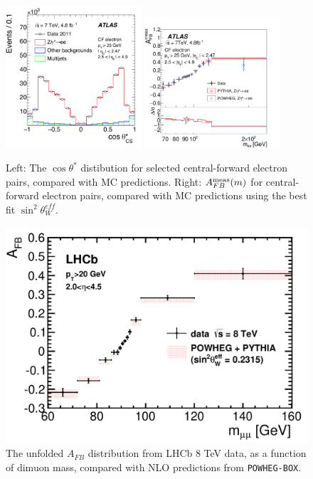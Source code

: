 \begin{figure}[p]
    \centering
    \includegraphics[width=0.45\textwidth]{figures/ss-precision-afb-atlas-cf-ct.pdf}
    \includegraphics[width=0.45\textwidth]{figures/ss-precision-afb-atlas-cf-afb.pdf}
    \caption{
    Left: The $\cos\theta^*$ distibution for selected central-forward electron pairs, compared with MC predictions.
    Right: $A^{\rm meas}_{FB}(m)$ for central-forward electron pairs, compared with MC predictions using the best fit $\sin^2\theta^{eff}_{W}$.}
    \label{fig:ss-precision-afb-atlas-cf}
\end{figure}

\begin{figure}[p]
    \centering
    \includegraphics[height=0.3\textheight]{figures/ss-precision-afb-lhcb.pdf}
    \caption{The
unfolded $A_{FB}$ distribution from LHCb 8 TeV data, as a function of dimuon mass, compared with NLO predictions from \texttt{POWHEG-BOX}.
    }
    \label{fig:ss-precision-afb-lhcb}
\end{figure}

